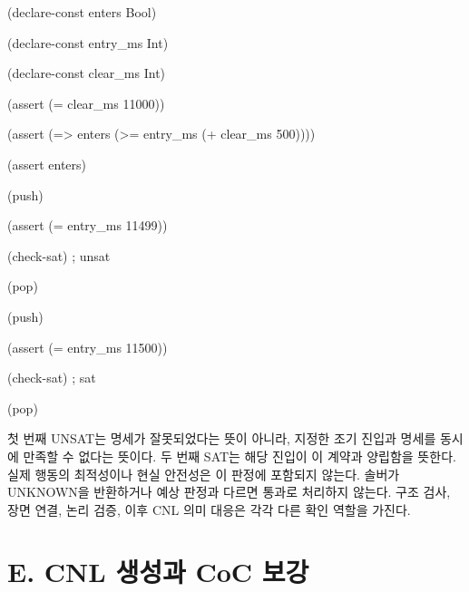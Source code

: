 \documentclass[11pt,a4paper]{article}
\begin{document}
\begingroup\small\ttfamily\setlength{\parskip}{1pt}
\noindent\hspace*{0.0em}(declare-const enters Bool)\par
\noindent\hspace*{0.0em}(declare-const entry\_\allowbreak{}ms Int)\par
\noindent\hspace*{0.0em}(declare-const clear\_\allowbreak{}ms Int)\par
\noindent\hspace*{0.0em}(assert (= clear\_\allowbreak{}ms 11000))\par
\noindent\hspace*{0.0em}(assert (=> enters (>= entry\_\allowbreak{}ms (+ clear\_\allowbreak{}ms 500))))\par
\noindent\hspace*{0.0em}(assert enters)\par
\noindent\hspace*{0.0em}(push)\par
\noindent\hspace*{0.0em}(assert (= entry\_\allowbreak{}ms 11499))\par
\noindent\hspace*{0.0em}(check-sat) ; unsat\par
\noindent\hspace*{0.0em}(pop)\par
\noindent\hspace*{0.0em}(push)\par
\noindent\hspace*{0.0em}(assert (= entry\_\allowbreak{}ms 11500))\par
\noindent\hspace*{0.0em}(check-sat) ; sat\par
\noindent\hspace*{0.0em}(pop)\par\endgroup\par

첫 번째 UNSAT는 명세가 잘못되었다는 뜻이 아니라, 지정한 조기 진입과 명세를 동시에 만족할 수 없다는 뜻이다. 두 번째 SAT는 해당 진입이 이 계약과 양립함을 뜻한다. 실제 행동의 최적성이나 현실 안전성은 이 판정에 포함되지 않는다. 솔버가 UNKNOWN을 반환하거나 예상 판정과 다르면 통과로 처리하지 않는다. 구조 검사, 장면 연결, 논리 검증, 이후 CNL 의미 대응은 각각 다른 확인 역할을 가진다.\par

\section*{E. CNL 생성과 CoC 보강}
\end{document}

